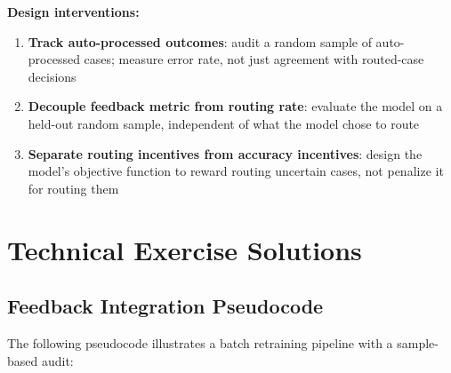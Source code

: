 \textbf{Design interventions:}
\begin{enumerate}
    \item \textbf{Track auto-processed outcomes}: audit a random sample of auto-processed cases; measure error rate, not just agreement with routed-case decisions
    \item \textbf{Decouple feedback metric from routing rate}: evaluate the model on a held-out random sample, independent of what the model chose to route
    \item \textbf{Separate routing incentives from accuracy incentives}: design the model's objective function to reward routing uncertain cases, not penalize it for routing them
\end{enumerate}

\section{Technical Exercise Solutions}

\subsection{Feedback Integration Pseudocode}

The following pseudocode illustrates a batch retraining pipeline with a sample-based audit:

